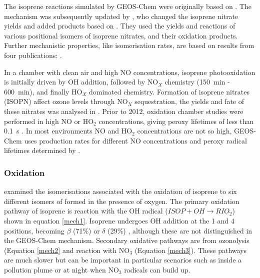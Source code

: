     The isoprene reactions simulated by GEOS-Chem were originally based on \textcite{Horowitz1998}.
    The mechanism was subsequently updated by \textcite{Mao2013}, who changed the isoprene nitrate yields and added products based on \textcite{Paulot2009a, Paulot2009b}.
    They used the yields and reactions of various positional isomers of isoprene nitrates, and their oxidation products. %
    Further mechanistic properties, like isomerisation rates, are based on results from four publications: \textcite{Peeters2009, Peeters2010, Crounse2011, Crounse2012}.    
    
    In a chamber with clean air and high NO concentrations, isoprene photooxidation is initially driven by OH addition, followed by NO$_X$ chemistry (150~min - 600~min), and finally HO$_X$ dominated chemistry.
    Formation of isoprene nitrates (ISOPN) affect ozone levels through NO$_X$ sequestration, the yields and fate of these nitrates was analysed in \textcite{Paulot2009a}.
    Prior to 2012, oxidation chamber studies were performed in high NO or HO$_2$ concentrations, giving peroxy lifetimes of less than 0.1~s \parencite{Crounse2012, Wolfe2012}.
    In most environments NO and HO$_2$ concentrations are not so high, GEOS-Chem uses production rates for different NO concentrations and peroxy radical lifetimes determined by \textcite{Crounse2012}.
    
    \subsubsection{Oxidation}
    
      \textcite{Crounse2011} examined the isomerisations associated with the oxidation of isoprene to six different isomers of \roo formed in the presence of oxygen.
      The primary oxidation pathway of isoprene is reaction with the OH radical ($ ISOP + OH \to RIO_2 $) shown in equation \ref{mech1}.
      Isoprene undergoes OH addition at the 1 and 4 positions, becoming $\beta$ (71\%) or $\delta$ (29\%) \roo, although these are not distinguished in the GEOS-Chem mechanism. 
      Secondary oxidative pathways are from ozonolysis (Equation \ref{mech2} and reaction with NO$_3$ (Equation \ref{mech3}).
      These pathways are much slower but can be important in particular scenarios such as inside a pollution plume or at night when NO$_3$ radicals can build up.
    
